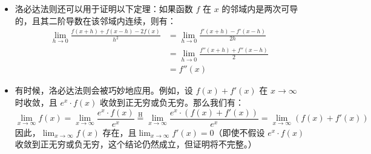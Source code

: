 \begin{itemize}
$$$$
\item 洛必达法则还可以用于证明以下定理：如果函数 $f$ 在 $x$ 的邻域内是两次可导的，且其二阶导数在该邻域内连续，则有：
$$
\begin{aligned}
\lim_{h \to 0} \frac{f(x+h) + f(x-h) - 2f(x)}{h^2}
&= \lim_{h \to 0} \frac{f'(x+h) - f'(x-h)}{2h}\\
&= \lim_{h \to 0} \frac{f''(x+h) + f''(x-h)}{2}\\
&= f''(x)
\end{aligned}~
$$
\item 有时候，洛必达法则会被巧妙地应用。例如，设 $f(x) + f'(x)$ 在 $x \to \infty$ 时收敛，且 $e^x \cdot f(x)$ 收敛到正无穷或负无穷。那么我们有：
$$
\lim_{x \to \infty} f(x)
= \lim_{x \to \infty} \frac{e^x \cdot f(x)}{e^x}
\stackrel{\mathrm{H}}{=}
\lim_{x \to \infty} \frac{e^x \cdot (f(x) + f'(x))}{e^x}
= \lim_{x \to \infty} (f(x) + f'(x))~
$$
因此，$\lim_{x \to \infty} f(x)$ 存在，且$\lim_{x \to \infty} f'(x) = 0$（即使不假设 $e^x \cdot f(x)$ 收敛到正无穷或负无穷，这个结论仍然成立，但证明将不完整。）
\end{itemize}

